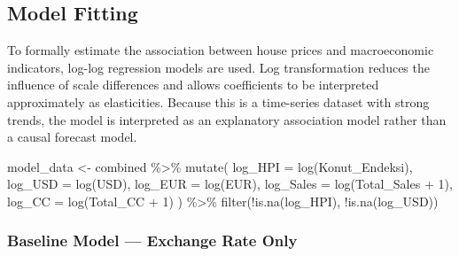 \documentclass[
  11pt,
  a4paper,
]{article}
\newenvironment{Shaded}{\begin{snugshade}}{\end{snugshade}}
\newcommand{\AttributeTok}[1]{\textcolor[rgb]{0.40,0.45,0.13}{#1}}
\newcommand{\DecValTok}[1]{\textcolor[rgb]{0.68,0.00,0.00}{#1}}
\newcommand{\FunctionTok}[1]{\textcolor[rgb]{0.28,0.35,0.67}{#1}}
\newcommand{\NormalTok}[1]{\textcolor[rgb]{0.00,0.23,0.31}{#1}}
\newcommand{\OtherTok}[1]{\textcolor[rgb]{0.00,0.23,0.31}{#1}}
\newcommand{\SpecialCharTok}[1]{\textcolor[rgb]{0.37,0.37,0.37}{#1}}
\begin{document}
\subsection{Model Fitting}\label{model-fitting}

To formally estimate the association between house prices and
macroeconomic indicators, log-log regression models are used. Log
transformation reduces the influence of scale differences and allows
coefficients to be interpreted approximately as elasticities. Because
this is a time-series dataset with strong trends, the model is
interpreted as an explanatory association model rather than a causal
forecast model.

\begin{Shaded}
\begin{Highlighting}[]
\NormalTok{model\_data }\OtherTok{\textless{}{-}}\NormalTok{ combined }\SpecialCharTok{\%\textgreater{}\%}
  \FunctionTok{mutate}\NormalTok{(}
    \AttributeTok{log\_HPI   =} \FunctionTok{log}\NormalTok{(Konut\_Endeksi),}
    \AttributeTok{log\_USD   =} \FunctionTok{log}\NormalTok{(USD),}
    \AttributeTok{log\_EUR   =} \FunctionTok{log}\NormalTok{(EUR),}
    \AttributeTok{log\_Sales =} \FunctionTok{log}\NormalTok{(Total\_Sales }\SpecialCharTok{+} \DecValTok{1}\NormalTok{),}
    \AttributeTok{log\_CC    =} \FunctionTok{log}\NormalTok{(Total\_CC }\SpecialCharTok{+} \DecValTok{1}\NormalTok{)}
\NormalTok{  ) }\SpecialCharTok{\%\textgreater{}\%}
  \FunctionTok{filter}\NormalTok{(}\SpecialCharTok{!}\FunctionTok{is.na}\NormalTok{(log\_HPI), }\SpecialCharTok{!}\FunctionTok{is.na}\NormalTok{(log\_USD))}
\end{Highlighting}
\end{Shaded}

\subsubsection{Baseline Model --- Exchange Rate
Only}\label{baseline-model-exchange-rate-only}
\end{document}
